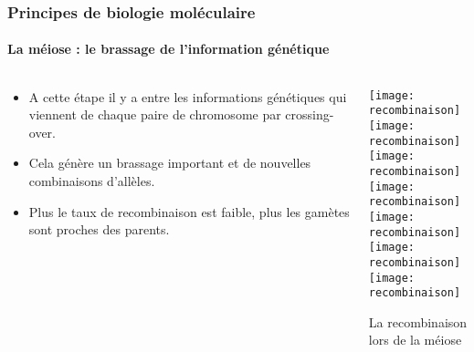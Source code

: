 \begin{frame}
\frametitle{Principes de biologie moléculaire}
\framesubtitle{La méiose : le brassage de l'information génétique}

\begin{columns}

\begin{column}{.4\textwidth}
\begin{itemize}
\item A cette étape il y a  entre les informations génétiques qui viennent de chaque paire de chromosome par crossing-over.

\item Cela génère un brassage important et de nouvelles combinaisons d'allèles.

\item Plus le taux de recombinaison est faible, plus les gamètes sont proches des parents.

\end{itemize}


\end{column}

\begin{column}{.6\textwidth}
\begin{center}
\begin{overprint}
\centering\texttt{[image: recombinaison]}\\
\centering\texttt{[image: recombinaison]}\\
\centering\texttt{[image: recombinaison]}\\
\centering\texttt{[image: recombinaison]}\\
\centering\texttt{[image: recombinaison]}\\
\centering\texttt{[image: recombinaison]}\\
\centering\texttt{[image: recombinaison]}\\
\end{overprint}
\small La recombinaison lors de la méiose \\
\end{center}
\end{column}

\end{columns}

\end{frame}

